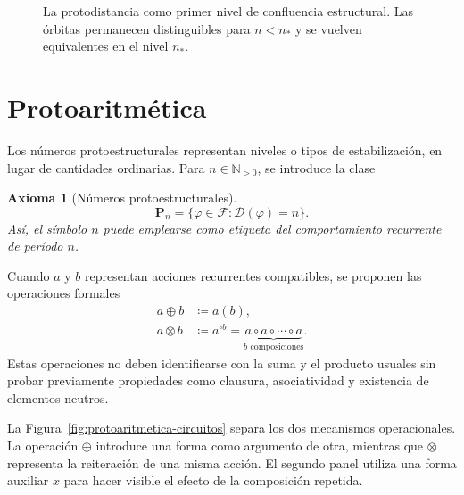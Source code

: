 \documentclass[11pt]{article}
\numberwithin{equation}{section}
\theoremstyle{prism}
\newtheorem{axioma}{Axioma}
\newcommand{\F}{\mathcal{F}}
\newcommand{\N}{\mathbb{N}}
\begin{document}
\begin{figure}[htbp]
  \caption{La protodistancia como primer nivel de confluencia estructural. Las
  órbitas permanecen distinguibles para $n<n_{*}$ y se vuelven equivalentes en
  el nivel $n_{*}$.}
  \label{fig:protodistancia-confluencia}
\end{figure}

\FloatBarrier
\section{Protoaritmética}

Los números protoestructurales representan niveles o tipos de estabilización,
en lugar de cantidades ordinarias. Para $n\in\N_{>0}$, se introduce la clase
\begin{axioma}[Números protoestructurales]
\begin{equation}
  \mathbf{P}_n
  =\bigl\{\varphi\in\F:\mathcal{D}(\varphi)=n\bigr\}.
  \label{eq:protonumero}
\end{equation}
Así, el símbolo $n$ puede emplearse como etiqueta del comportamiento recurrente
de período $n$.
\end{axioma}

Cuando $a$ y $b$ representan acciones recurrentes compatibles, se proponen las
operaciones formales
\begin{align}
  a\oplus b &\coloneqq a(b),
  \\
  a\otimes b &\coloneqq a^{\circ b}
  =\underbrace{a\circ a\circ\cdots\circ a}_{b\text{ composiciones}}.
\end{align}
Estas operaciones no deben identificarse con la suma y el producto usuales sin
probar previamente propiedades como clausura, asociatividad y existencia de
elementos neutros.

La Figura~\ref{fig:protoaritmetica-circuitos} separa los dos mecanismos
operacionales. La operación $\oplus$ introduce una forma como argumento de otra,
mientras que $\otimes$ representa la reiteración de una misma acción. El segundo
panel utiliza una forma auxiliar $x$ para hacer visible el efecto de la
composición repetida.
\end{document}
